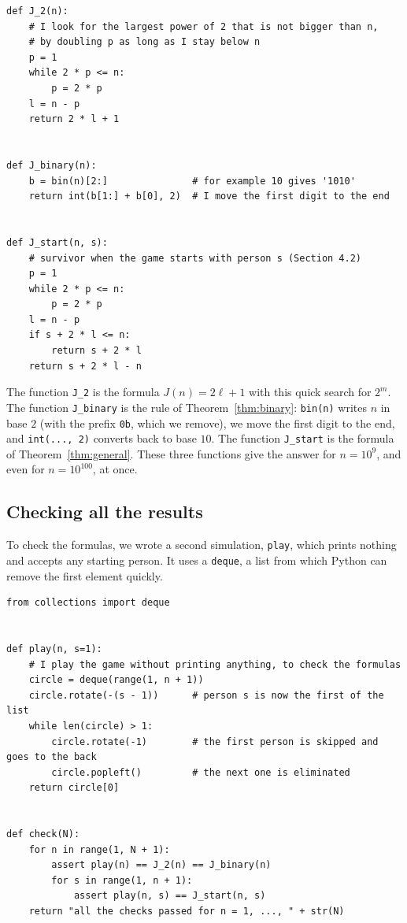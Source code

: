 \begin{lstlisting}[language=iPython, caption={Faster functions for $J(n)$ and for a game that starts with person $s$.}]
def J_2(n):
    # I look for the largest power of 2 that is not bigger than n,
    # by doubling p as long as I stay below n
    p = 1
    while 2 * p <= n:
        p = 2 * p
    l = n - p
    return 2 * l + 1


def J_binary(n):
    b = bin(n)[2:]               # for example 10 gives '1010'
    return int(b[1:] + b[0], 2)  # I move the first digit to the end


def J_start(n, s):
    # survivor when the game starts with person s (Section 4.2)
    p = 1
    while 2 * p <= n:
        p = 2 * p
    l = n - p
    if s + 2 * l <= n:
        return s + 2 * l
    return s + 2 * l - n
\end{lstlisting}

The function \texttt{J\_2} is the formula $J(n)=2\ell+1$ with this quick
search for $2^m$. The function \texttt{J\_binary} is the rule of
Theorem~\ref{thm:binary}: \texttt{bin(n)} writes $n$ in base $2$ (with the
prefix \texttt{0b}, which we remove), we move the first digit to the end, and
\texttt{int(..., 2)} converts back to base $10$. The function \texttt{J\_start}
is the formula of Theorem~\ref{thm:general}. These three functions give the
answer for $n=10^9$, and even for $n=10^{100}$, at once.

\subsection{Checking all the results}

To check the formulas, we wrote a second simulation, \texttt{play}, which
prints nothing and accepts any starting person. It uses a \texttt{deque}, a
list from which Python can remove the first element quickly.

\begin{lstlisting}[language=iPython, caption={The simulation used to check every formula.}]
from collections import deque


def play(n, s=1):
    # I play the game without printing anything, to check the formulas
    circle = deque(range(1, n + 1))
    circle.rotate(-(s - 1))      # person s is now the first of the list
    while len(circle) > 1:
        circle.rotate(-1)        # the first person is skipped and goes to the back
        circle.popleft()         # the next one is eliminated
    return circle[0]


def check(N):
    for n in range(1, N + 1):
        assert play(n) == J_2(n) == J_binary(n)
        for s in range(1, n + 1):
            assert play(n, s) == J_start(n, s)
    return "all the checks passed for n = 1, ..., " + str(N)
\end{lstlisting}


